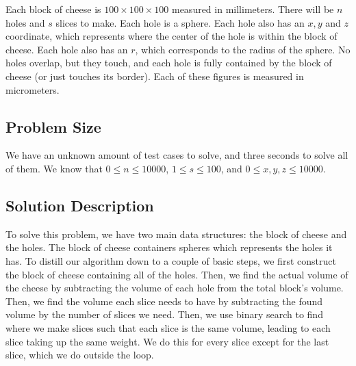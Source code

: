 \documentclass[12pt]{article}
\begin{document}
Each block of cheese is $100 \times 100 \times 100$ measured in millimeters.
There will be $n$ holes and $s$ slices to make. Each hole is a sphere.
Each hole also has an $x, y$ and $z$ coordinate, which represents where
the center of the hole is within the block of cheese. Each hole also
has an $r$, which corresponds to the radius of the sphere. No holes
overlap, but they touch, and each hole is fully contained by the block
of cheese (or just touches its border). Each of these figures is
measured in micrometers.

\subsection{Problem Size}

We have an unknown amount of test cases to solve, and three seconds
to solve all of them. We know that $0 \leq n \leq 10000$, $1 \leq s
\leq 100$, and $0 \leq x, y, z \leq 10000$.

\subsection{Solution Description}

To solve this problem, we have two main data structures: the block
of cheese and the holes. The block of cheese containers spheres
which represents the holes it has. To distill our algorithm down
to a couple of basic steps, we first construct the block of cheese
containing all of the holes. Then, we find the actual volume of
the cheese by subtracting the volume of each hole from the total
block's volume. Then, we find the volume each slice needs to have
by subtracting the found volume by the number of slices we need.
Then, we use binary search to find where we make slices such that
each slice is the same volume, leading to each slice taking up the
same weight. We do this for every slice except for the last slice,
which we do outside the loop.
\end{document}
